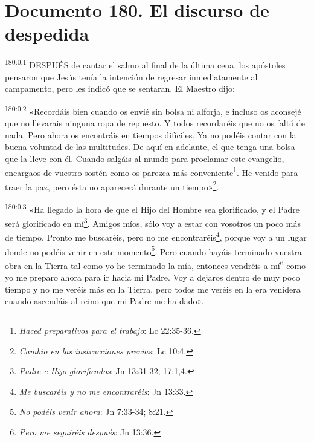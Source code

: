 \chapter{Documento 180. El discurso de despedida}
\par
\textsuperscript{180:0.1} DESPUÉS de cantar el salmo al final de la última cena, los apóstoles pensaron que Jesús tenía la intención de regresar inmediatamente al campamento, pero les indicó que se sentaran. El Maestro dijo:

\par
\textsuperscript{180:0.2} «Recordáis bien cuando os envié sin bolsa ni alforja, e incluso os aconsejé que no llevarais ninguna ropa de repuesto. Y todos recordaréis que no os faltó de nada. Pero ahora os encontráis en tiempos difíciles. Ya no podéis contar con la buena voluntad de las multitudes. De aquí en adelante, el que tenga una bolsa que la lleve con él. Cuando salgáis al mundo para proclamar este evangelio, encargaos de vuestro sostén como os parezca más conveniente\footnote{\textit{Haced preparativos para el trabajo}: Lc 22:35-36.}. He venido para traer la paz, pero ésta no aparecerá durante un tiempo»\footnote{\textit{Cambio en las instrucciones previas}: Lc 10:4.}.

\par
\textsuperscript{180:0.3} «Ha llegado la hora de que el Hijo del Hombre sea glorificado, y el Padre será glorificado en mí\footnote{\textit{Padre e Hijo glorificados}: Jn 13:31-32; 17:1,4.}. Amigos míos, sólo voy a estar con vosotros un poco más de tiempo. Pronto me buscaréis, pero no me encontraréis\footnote{\textit{Me buscaréis y no me encontraréis}: Jn 13:33.}, porque voy a un lugar donde no podéis venir en este momento\footnote{\textit{No podéis venir ahora}: Jn 7:33-34; 8:21.}. Pero cuando hayáis terminado vuestra obra en la Tierra tal como yo he terminado la mía, entonces vendréis a mí\footnote{\textit{Pero me seguiréis después}: Jn 13:36.} como yo me preparo ahora para ir hacia mi Padre. Voy a dejaros dentro de muy poco tiempo y no me veréis más en la Tierra, pero todos me veréis en la era venidera cuando ascendáis al reino que mi Padre me ha dado».

